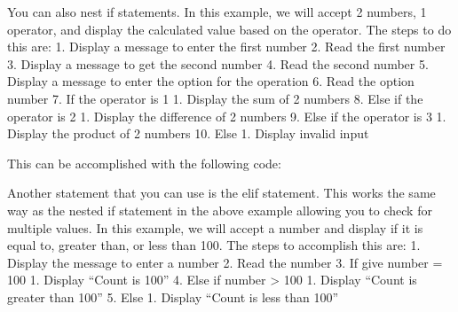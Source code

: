 You can also nest if statements. In this example, we will accept 2
numbers, 1 operator, and display the calculated value based on the
operator. The steps to do this are: 1. Display a message to enter the
first number 2. Read the first number 3. Display a message to get the
second number 4. Read the second number 5. Display a message to enter
the option for the operation 6. Read the option number 7. If the
operator is 1 1. Display the sum of 2 numbers 8. Else if the operator is
2 1. Display the difference of 2 numbers 9. Else if the operator is 3 1.
Display the product of 2 numbers 10. Else 1. Display invalid input

This can be accomplished with the following code:

\begin{Shaded}
\begin{Highlighting}[]
 
 
 
 
 
 
 
 
 
\KeywordTok{if [}   \KeywordTok{ ]}
     \NormalTok{+ }
  \KeywordTok{if [}   \KeywordTok{ ]}
       \NormalTok{- }
    \KeywordTok{if [}   \KeywordTok{ ]}
         \NormalTok{* }
       
\end{Highlighting}
\end{Shaded}

Another statement that you can use is the elif statement. This works the
same way as the nested if statement in the above example allowing you to
check for multiple values. In this example, we will accept a number and
display if it is equal to, greater than, or less than 100. The steps to
accomplish this are: 1. Display the message to enter a number 2. Read
the number 3. If give number = 100 1. Display ``Count is 100'' 4. Else
if number \textgreater{} 100 1. Display ``Count is greater than 100'' 5.
Else 1. Display ``Count is less than 100''

